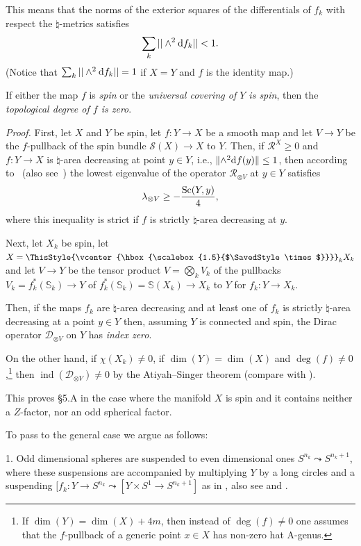 \documentclass[10pt,a4paper]{amsart}
\numberwithin{equation}{section}
\newcommand\bigtimes{\mathbin{\ThisStyle{\vcenter{\hbox{%
\scalebox{1.5}{$\SavedStyle\times$}}}}}}
\begin{document}
This means that the norms of the exterior squares of the differentials of $f _k$ with respect the $\natural$-metrics satisfies
\begin{equation}
\sum_k||\wedge^2{\rm d}f_k||< 1.\label{eq-a}
\end{equation}
(Notice that $\sum_k||\wedge^2{\rm d}f_k||= 1$ if $X=Y$ and $f$ is the identity map.)

If either the map $f$ is {\it spin} or the {\it universal covering of $Y$ is spin}, then the {\it topological degree of $f$ is zero}.


{\it Proof.} First, let $X$ and $Y$ be spin, let $f\colon Y\to X$ be a smooth map and
 let $V\to Y$ be the $f$-pullback of the spin bundle $\mathcal S (X)\to X$ to $Y$.
Then, if $\mathcal R^X\geq 0$ and $ f\colon Y\to X$ is $\natural$-area decreasing at point $y\in Y$, i.e., $\|{\wedge}^2{\rm d}f(y)\|\leq 1$, then
according to~\cite{GS2002} (also see~\cite{Li2010}) the lowest eigenvalue of the operator
$\mathcal R_{\otimes V} $ at $y\in Y$ satisfies
\[
\lambda_{\otimes V}\geq -{\operatorname{Sc}(Y,y)\over 4},
\]
where this inequality is strict if $ f$ is strictly $\natural$-area decreasing at $y$.

 Next, let $X_k$ be spin, let $X=\bigtimes_kX_k$ and let $V\to Y$ be the tensor product $V=\bigotimes_kV_k$
of the pullbacks $V_k=f^\ast_k (\mathbb S_k)\to Y$ of $f^\ast_k (\mathbb S_k)=\mathbb S(X_k)\to X_k$ to $Y$ for $f_k\colon Y\to X_k$.

Then, if the maps $f_k$ are $\natural$-area decreasing and at least
one of $f_k$ is strictly $\natural$-area decreasing at a point $y\in Y$
 then, assuming $Y$ is connected and spin, the Dirac operator $\mathcal D_{\otimes V}$ on $Y$ has {\it index zero}.

On the other hand, if $\chi(X_k)\neq 0$, if $\dim(Y)=\dim(X)$ and
$\deg (f)\neq 0$,\footnote{If $\dim(Y)=\dim(X)+4m$, then instead of $\deg(f)\neq 0$ one assumes that the $f$-pullback of a generic point $x\in X$ has non-zero
hat A-genus.}
 then $\operatorname{ind}( \mathcal D_{\otimes V})\neq 0$ by the
 Atiyah--Singer theorem (compare with \cite{GS2002, Li2010, Ll1998}).

This proves \S5.A in the case where the manifold $X$ is spin and it contains neither a $Z$-factor, nor an
odd spherical factor.

 To pass to the general case we argue as follows:

1. Odd dimensional spheres are suspended to even dimensional
ones $S^{n_k}\leadsto S^{n_k+1}$, where these suspensions
 are accompanied by multiplying $Y$ by a long circles and a suspending $[f_k\colon Y\to S^{n_k}\leadsto [Y\times S^1\to S^{n_k+1}]$ as
 in \cite{Ll1998}, also see \cite[\S3.4.1]{Gr2021} and \cite{Gr2023}.
\end{document}
